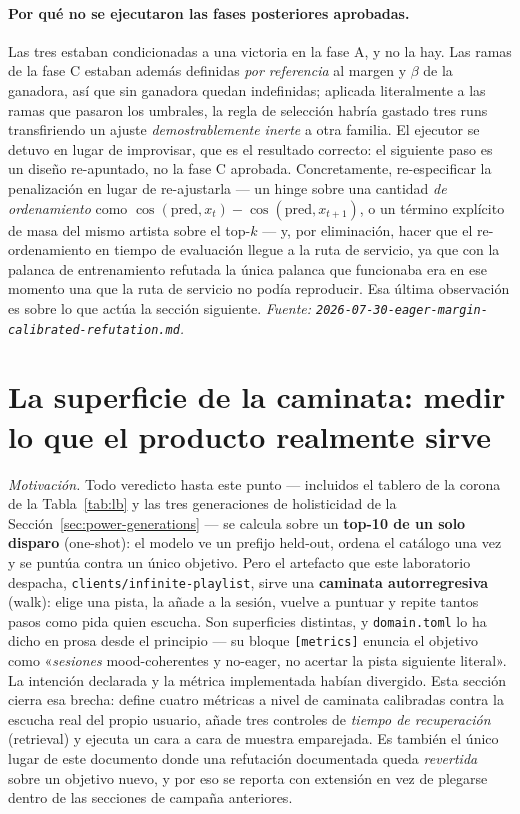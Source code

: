 \documentclass[11pt]{article}
\begin{document}
\paragraph{Por qué no se ejecutaron las fases posteriores aprobadas.} Las tres
estaban condicionadas a una victoria en la fase A, y no la hay. Las ramas de la fase
C estaban además definidas \emph{por referencia} al margen y $\beta$ de la
ganadora, así que sin ganadora quedan indefinidas; aplicada literalmente a las ramas
que pasaron los umbrales, la regla de selección habría gastado tres runs
transfiriendo un ajuste \emph{demostrablemente inerte} a otra familia. El ejecutor
se detuvo en lugar de improvisar, que es el resultado correcto: el siguiente paso es
un diseño re-apuntado, no la fase C aprobada. Concretamente, re-especificar la
penalización en lugar de re-ajustarla --- un hinge sobre una cantidad \emph{de
ordenamiento} como $\cos(\mathrm{pred}, x_t) - \cos(\mathrm{pred}, x_{t+1})$, o un
término explícito de masa del mismo artista sobre el top-$k$ --- y, por eliminación,
hacer que el re-ordenamiento en tiempo de evaluación llegue a la ruta de servicio,
ya que con la palanca de entrenamiento refutada la única palanca que funcionaba era
en ese momento una que la ruta de servicio no podía reproducir. Esa última
observación es sobre lo que actúa la sección siguiente.
\emph{Fuente: \texttt{2026-07-30-eager-margin-calibrated-refutation.md}.}

\section{La superficie de la caminata: medir lo que el producto realmente sirve}
\label{sec:walk}
\emph{Motivación.} Todo veredicto hasta este punto --- incluidos el tablero de
la corona de la Tabla~\ref{tab:lb} y las tres generaciones de holisticidad de la
Sección~\ref{sec:power-generations} --- se calcula sobre un \textbf{top-10 de un
solo disparo} (one-shot): el modelo ve un prefijo held-out, ordena el catálogo
una vez y se puntúa contra un único objetivo. Pero el artefacto que este
laboratorio despacha, \texttt{clients/infinite-playlist}, sirve una
\textbf{caminata autorregresiva} (walk): elige una pista, la añade a la sesión,
vuelve a puntuar y repite tantos pasos como pida quien escucha. Son superficies
distintas, y \texttt{domain.toml} lo ha dicho en prosa desde el principio --- su
bloque \texttt{[metrics]} enuncia el objetivo como «\emph{sesiones}
mood-coherentes y no-eager, no acertar la pista siguiente literal». La intención
declarada y la métrica implementada habían divergido. Esta sección cierra esa
brecha: define cuatro métricas a nivel de caminata calibradas contra la escucha
real del propio usuario, añade tres controles de \emph{tiempo de recuperación}
(retrieval) y ejecuta un cara a cara de muestra emparejada. Es también el único
lugar de este documento donde una refutación documentada queda
\emph{revertida} sobre un objetivo nuevo, y por eso se reporta con extensión en
vez de plegarse dentro de las secciones de campaña anteriores.
\end{document}
